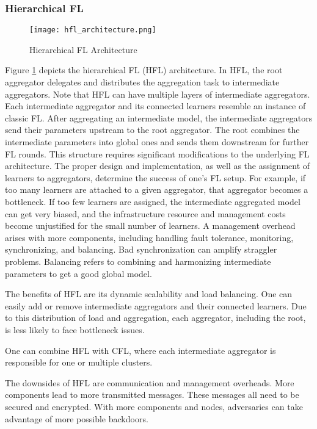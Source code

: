 \subsubsection{Hierarchical FL}
\begin{figure}[h]
    \centering
    \texttt{[image: hfl\_architecture.png]}
    \caption{Hierarchical FL Architecture}
    \label{fig:hfl_architecture}
\end{figure}
Figure \ref{fig:hfl_architecture} depicts the hierarchical FL (HFL) architecture.
In HFL, the root aggregator delegates and distributes the aggregation task to 
intermediate aggregators.
Note that HFL can have multiple layers of intermediate aggregators.
Each intermediate aggregator and its connected learners resemble an instance of classic FL.
After aggregating an intermediate model, the intermediate aggregators send their parameters
upstream to the root aggregator.
The root combines the intermediate parameters into global ones and sends them downstream for further FL rounds.
This structure requires significant modifications to the underlying FL architecture.
The proper design and implementation, as well as the assignment of learners to aggregators,
determine the success of one's FL setup.
For example, if too many learners are attached to a given aggregator, that aggregator becomes a bottleneck.
If too few learners are assigned, the intermediate aggregated model can get
very biased, and the infrastructure resource and management costs become unjustified for the small number of learners.
A management overhead arises with more components, including handling fault tolerance,
monitoring, synchronizing, and balancing.
Bad synchronization can amplify straggler problems.
Balancing refers to combining and harmonizing intermediate parameters to
get a good global model.

The benefits of HFL are its dynamic scalability and load balancing.
One can easily add or remove intermediate aggregators and their connected learners.
Due to this distribution of load and aggregation, each aggregator, including the root,
is less likely to face bottleneck issues.

One can combine HFL with CFL, where each intermediate aggregator is responsible
for one or multiple clusters.

The downsides of HFL are communication and management overheads.
More components lead to more transmitted messages.
These messages all need to be secured and encrypted.
With more components and nodes, adversaries can take advantage of more possible backdoors.

